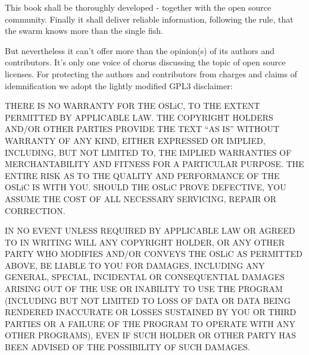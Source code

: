 %
%
%
%

%


This book shall be thoroughly developed - together with the open source
community. Finally it shall deliver reliable information, following the rule,
that the swarm knows more than the single fish.

But nevertheless it can't offer more than the opinion(s) of its authors and
contributors. It's only one voice of chorus discussing the topic of open source
licenses. For protecting the authors and contributors from charges and
claims of idemnification we adopt the lightly modified GPL3 disclaimer:

THERE IS NO WARRANTY FOR THE OSLiC, TO THE EXTENT PERMITTED BY APPLICABLE LAW.
THE COPYRIGHT HOLDERS AND/OR OTHER PARTIES PROVIDE THE TEXT “AS IS” WITHOUT
WARRANTY OF ANY KIND, EITHER EXPRESSED OR IMPLIED, INCLUDING, BUT NOT LIMITED
TO, THE IMPLIED WARRANTIES OF MERCHANTABILITY AND FITNESS FOR A PARTICULAR
PURPOSE. THE ENTIRE RISK AS TO THE QUALITY AND PERFORMANCE OF THE OSLiC IS
WITH YOU. SHOULD THE OSLiC PROVE DEFECTIVE, YOU ASSUME THE COST OF ALL
NECESSARY SERVICING, REPAIR OR CORRECTION.

IN NO EVENT UNLESS REQUIRED BY APPLICABLE LAW OR AGREED TO IN WRITING WILL ANY
COPYRIGHT HOLDER, OR ANY OTHER PARTY WHO MODIFIES AND/OR CONVEYS THE OSLiC AS
PERMITTED ABOVE, BE LIABLE TO YOU FOR DAMAGES, INCLUDING ANY GENERAL, SPECIAL,
INCIDENTAL OR CONSEQUENTIAL DAMAGES ARISING OUT OF THE USE OR INABILITY TO USE
THE PROGRAM (INCLUDING BUT NOT LIMITED TO LOSS OF DATA OR DATA BEING RENDERED
INACCURATE OR LOSSES SUSTAINED BY YOU OR THIRD PARTIES OR A FAILURE OF THE
PROGRAM TO OPERATE WITH ANY OTHER PROGRAMS), EVEN IF SUCH HOLDER OR OTHER PARTY
HAS BEEN ADVISED OF THE POSSIBILITY OF SUCH DAMAGES.